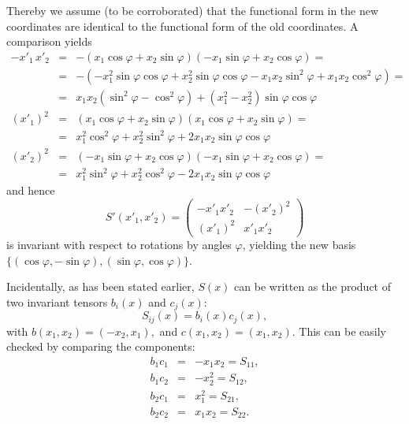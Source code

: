 {Thereby we assume (to be corroborated) that the functional form in the new coordinates are identical
to the functional form of the old coordinates.
A comparison yields
\begin{eqnarray*}
  -x'_1 \,x'_2 & = &
  -\left(x_1 \cos \varphi + x_2 \sin \varphi \right)
  \left(-x_1 \sin \varphi + x_2 \cos \varphi \right) = \\
  & = &
  -\left(
    -x_1^2 \sin \varphi \cos \varphi +
      x_2^2 \sin \varphi \cos \varphi -
      x_1 x_2 \sin^2 \varphi + x_1 x_2 \cos^2 \varphi
  \right) = \\
  & = &
  x_1 x_2 \left(\sin^2 \varphi - \cos^2 \varphi \right) +
    \left(x_1^2 - x_2^2\right) \sin \varphi \cos \varphi \\
  (x'_1)^2  & = &
    \left(x_1 \cos \varphi + x_2 \sin \varphi \right)
    \left(x_1 \cos \varphi + x_2 \sin \varphi \right) = \\
  & = & x_1^2 \cos^2 \varphi + x_2^2 \sin^2 \varphi +
    2 x_1 x_2 \sin \varphi \cos \varphi \\
  (x'_2)^2  & = &
    \left(-x_1 \sin \varphi + x_2 \cos \varphi \right)
    \left(-x_1 \sin \varphi + x_2 \cos \varphi \right) = \\
  & = & x_1^2 \sin^2 \varphi + x_2^2 \cos^2 \varphi -
    2 x_1 x_2 \sin \varphi \cos \varphi
\end{eqnarray*}
and hence
$$S' (x'_1,x'_2)=\left(
    \begin{array}{cc}
      -x'_1x'_2 & -(x'_2)^2 \\
      (x'_1)^2   & x'_1x'_2
    \end{array}
\right)
$$ is invariant with respect to rotations by angles $\varphi$, yielding the new basis
$\{ (\cos \varphi ,-\sin \varphi
),(\sin
\varphi ,\cos \varphi )\}$.


Incidentally,
as has been stated earlier, $S(x)$ can be written as the product of two invariant tensors $b_i(x)$ and $c_j(x)$:
$$S_{ij}(x)=b_i(x)c_j(x),$$
with
$
b(x_1,x_2)=(-x_2,x_1),
$ and
$
c(x_1,x_2)=(x_1,x_2)
$.
This can be easily checked by comparing the components:
\begin{eqnarray*}
b_1c_1&=&-x_1x_2 = S_{11},\\
b_1c_2&=&-x_2^2 = S_{12},\\
b_2c_1&=&x_1^2 = S_{21},\\
b_2c_2&=&x_1x_2 = S_{22}.\\
\end{eqnarray*}

}

